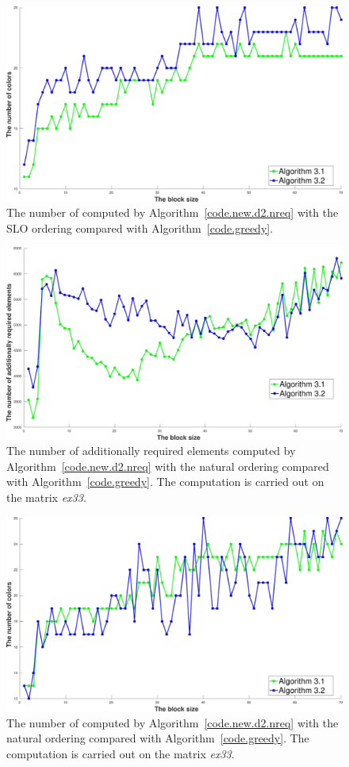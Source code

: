 \documentclass[12pt, twoside,a4paper,toc=bibliography]{scrbook}
\newcommand{\coderef}[1]{Algorithm~\protect\ref{#1}}
\begin{document}
\begin{figure}
\centering
\includegraphics[width=0.9\linewidth]{ex33_alg31_alg32_bls_slo_cols}
\caption{The number of computed by \coderef{code.new.d2.nreq} with the SLO ordering
compared with \coderef{code.greedy}. }
\label{ex33_alg31_alg32_bls_slo_cols}
\end{figure}

\begin{figure}
\centering
\includegraphics[width=0.9\linewidth]{ex33_alg31_alg32_bls_nat_add}
\caption{The number of additionally required elements computed by 
\coderef{code.new.d2.nreq} with the natural ordering
compared with \coderef{code.greedy}.
The computation is carried out on the matrix \textit{ex33}. }
\label{ex33_alg31_alg32_bls_nat_add}
\end{figure}

\begin{figure}
\centering
\includegraphics[width=0.9\linewidth]{ex33_alg31_alg32_bls_nat_cols}
\caption{The number of computed by \coderef{code.new.d2.nreq} with the natural ordering
compared with \coderef{code.greedy}. 
The computation is carried out on the matrix \textit{ex33}. }
\label{ex33_alg31_alg32_bls_nat_cols}
\end{figure}
\end{document}
